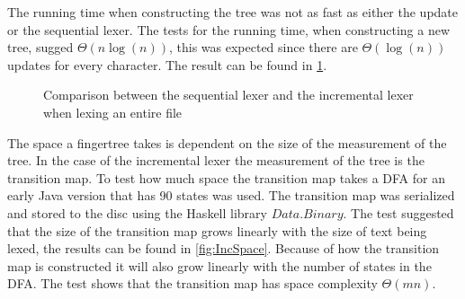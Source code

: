 The running time when constructing the tree was not as fast as either the update
or the sequential lexer. The tests for the running time, when constructing a new
tree, sugged $\Theta (n\log(n))$, this was expected since there are
$\Theta(\log(n))$ updates for every character. The result can be found in
\cref{fig:IncNewTime}.

\begin{figure}[!h]
\caption{Comparison between the sequential lexer and the incremental lexer when
         lexing an entire file\label{fig:IncNewTime}}
\end{figure}

\newpage

The space a fingertree takes is dependent on the size of the measurement of the
tree. In the case of the incremental lexer the measurement of the tree is the
transition map. To test how much space the transition map takes a DFA for an
early Java version that has 90 states was used. The transition map was
serialized and stored to the disc using the Haskell library $Data.Binary$. The
test suggested that the size of the transition map grows linearly with the size
of text being lexed, the results can be found in \cref{fig:IncSpace}. Because of
how the transition map is constructed it will also grow linearly with the number
of states in the DFA. The test shows that the transition map has space
complexity $\Theta(mn)$.

